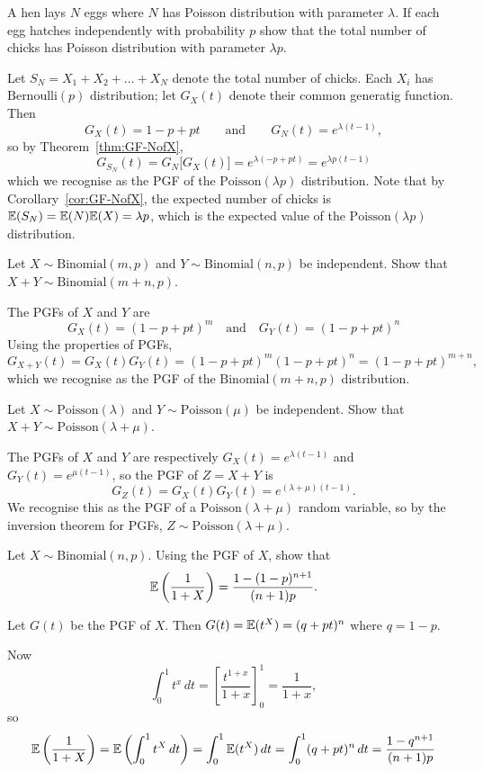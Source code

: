 \begin{example}
A hen lays $N$ eggs where $N$ has Poisson distribution with parameter $\lambda$. If each egg hatches independently with probability $p$ show that the total number of chicks has Poisson distribution with parameter $\lambda p$.
\end{example}
\begin{solution}
Let $S_N = X_1+X_2+\ldots+X_N$ denote the total number of chicks. Each $X_i$ has $\text{Bernoulli}(p)$ distribution; let $G_X(t)$ denote their common generatig function. Then
\[
G_X(t) = 1 - p + pt \qquad\text{and}\qquad G_N(t) = e^{\lambda(t-1)},
\]
so by Theorem~\ref{thm:GF-NofX}, 
\[
G_{S_N}(t) = G_N\big[G_X(t)\big] = e^{\lambda(-p+pt)} = e^{\lambda p(t-1)}
\]
which we recognise as the PGF of the $\text{Poisson}(\lambda p)$ distribution. Note that by Corollary~\ref{cor:GF-NofX}, the expected number of chicks is $\mathbb{E}(S_N) = \mathbb{E}(N)\mathbb{E}(X) = \lambda p$, which is the expected value of the $\text{Poisson}(\lambda p)$ distribution.
\end{solution}

\begin{exercise}
\begin{questions}
\question
Let $X\sim\text{Binomial}(m,p)$ and $Y\sim\text{Binomial}(n,p)$ be independent. Show that $X+Y\sim\text{Binomial}(m+n,p)$.
\begin{answer}
The PGFs of $X$ and $Y$ are
\[
G_X(t) = (1-p+pt)^m
\quad\text{and}\quad
G_Y(t) = (1-p+pt)^n
\]
Using the properties of PGFs,
\[
G_{X+Y}(t) = G_X(t)G_Y(t) = (1-p+pt)^m (1-p+pt)^n = (1-p+pt)^{m+n},
\]
which we recognise as the PGF of the $\text{Binomial}(m+n,p)$ distribution.
\end{answer}

\question
Let $X\sim\text{Poisson}(\lambda)$ and $Y\sim\text{Poisson}(\mu)$ be independent. Show that $X+Y\sim\text{Poisson}(\lambda+\mu)$.
\begin{answer}
The PGFs of $X$ and $Y$ are respectively $G_X(t)= e^{\lambda(t-1)}$ and $G_Y(t) = e^{\mu(t-1)}$, so the PGF of $Z=X+Y$ is 
\[
G_Z(t) = G_X(t)G_Y(t) = e^{(\lambda+\mu)(t-1)}.
\]
We recognise this as the PGF of a $\text{Poisson}(\lambda+\mu)$ random variable, so by the inversion theorem for PGFs, $Z\sim\text{Poisson}(\lambda+\mu)$.
\end{answer}

\question %
Let $X\sim\text{Binomial}(n,p)$. Using the PGF of $X$, show that 
\[
\mathbb{E}\left(\frac{1}{1+X}\right) = \frac{1-(1-p)^{n+1}}{(n+1)p}.
\]

\begin{answer}
Let $G(t)$ be the PGF of $X$. Then $G(t)=\mathbb{E}(t^X) = (q+pt)^n$ where $q=1-p$. 

Now
\[
\int_0^1 t^x\,dt = \left[\frac{t^{1+x}}{1+x}\right]_0^1 = \frac{1}{1+x},
\]
so
\[
\mathbb{E}\left(\frac{1}{1+X}\right) 
	= \mathbb{E}\left(\int_0^1 t^X \,dt\right)
	= \int_0^1 \mathbb{E}(t^X)\,dt 
	= \int_0^1 (q+pt)^n\,dt
	= \frac{1-q^{n+1}}{(n+1)p}
\]
\end{answer}

\end{questions}
\end{exercise}

